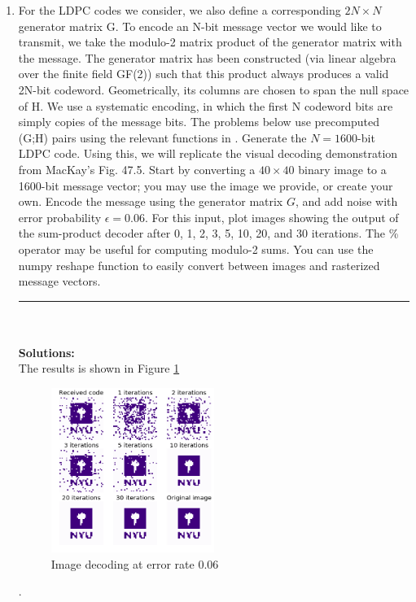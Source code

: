 \documentclass{article}
\begin{document}
\begin{enumerate}
\begin{enumerate}
\pagebreak
\item For the LDPC codes we consider, we also define a corresponding $2N\times N$ generator matrix G. To encode an N-bit message vector we would like to transmit, we take the modulo-2 matrix product of the generator matrix with the message. The generator matrix has been constructed (via linear algebra over the  finite field GF(2)) such that this product always produces a valid 2N-bit codeword. Geometrically, its columns are chosen to span the null space of H. We use a systematic encoding, in which the first N codeword bits are simply copies of the message bits. The problems below use precomputed (G;H) pairs using the relevant functions in  . Generate the $N = 1600$-bit LDPC code. Using this, we will replicate the visual decoding demonstration from MacKay's Fig. 47.5. Start by converting a $40\times 40$ binary image to a 1600-bit message vector; you may use the  image we provide, or create your own. Encode the message using the  generator matrix $G$,
and add noise with error probability $\epsilon = 0.06$. For this input, plot images showing the output of the sum-product decoder after 0, 1, 2, 3, 5, 10, 20, and 30 iterations. The \%
operator may be useful for computing modulo-2 sums. You can use the numpy reshape function to easily convert between images and rasterized message vectors.
\\
\noindent\rule{14cm}{2pt}
\\
\\
\textbf{Solutions:}
\\
The results is shown in Figure \ref{fig:p3-pte}
\begin{figure}
\includegraphics[width=0.5\textwidth]{p3-pte.png}
\centering
\caption{Image decoding at error rate 0.06}
\label{fig:p3-pte}
\end{figure}.



\end{enumerate}
\end{enumerate}
\end{document}
